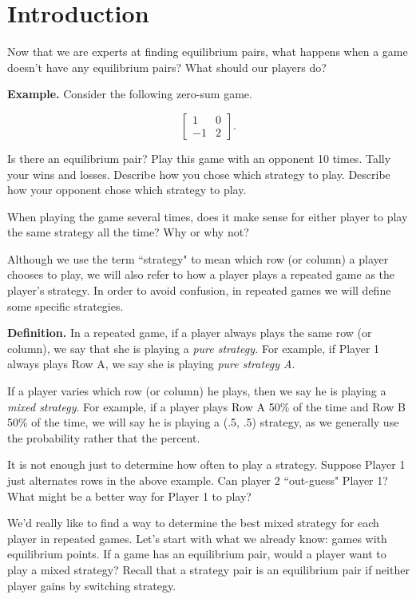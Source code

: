\section{Introduction}

Now that we are experts at finding equilibrium pairs, what happens when a game doesn't have any equilibrium pairs? What should our players do?

{\bf Example.} Consider the following zero-sum game.

\[\left[\begin{matrix}
1&0\\
-1&2

\end{matrix}\right].\]

Is there an equilibrium pair? Play this game with an opponent 10 times. Tally your wins and losses. Describe how you chose which strategy to play. Describe how your opponent chose which strategy to play.

When playing the game several times, does it make sense for either player to play the same strategy all the time? Why or why not?

Although we use the term ``strategy" to mean which row (or column) a player chooses to play, we will also refer to how a player plays a repeated game as the player's strategy. In order to avoid confusion, in repeated games we will define some specific strategies.

{\bf Definition.} In a repeated game, if a player always plays the same row (or column), we say that she is playing a {\it pure strategy.} For example, if Player 1 always plays Row A, we say she is playing {\it pure strategy A}. 

If a player varies which row (or column) he plays, then we say he is playing a {\it mixed strategy}. For example, if a player plays Row A 50\% of the time and Row B 50\% of the time, we will say he is playing a (.5, .5) strategy, as we generally use the probability rather that the percent.  

It is not enough just to determine how often to play a strategy. Suppose Player 1 just alternates rows in the above example. Can player 2 ``out-guess" Player 1? What might be a better way for Player 1 to play?

We'd really like to find a way to determine the best mixed strategy for each player in repeated games. Let's start with what we already know: games with equilibrium points. If a game has an equilibrium pair, would a player want to play a mixed strategy?  Recall that a strategy pair is an equilibrium pair if neither player gains by switching strategy. 

